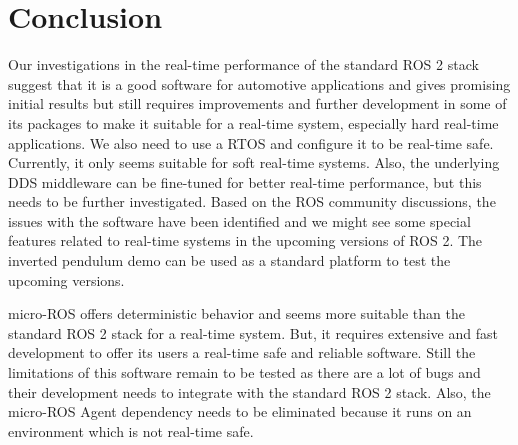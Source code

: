 \documentclass[%
xelatex,
	oneside,		%
	12pt,			%
	parskip=half,	%
	abstracton,
	chapterprefix=true%
    appendixprefix=true]
{scrbook}
\begin{document}
		\chapter{Conclusion}
			
\rofoot[\pagemark]{\pagemark}
Our investigations in the real-time performance of the standard ROS 2 stack suggest that it is a good software for automotive applications and gives promising initial results but still requires improvements and further development in some of its packages to make it suitable for a real-time system, especially hard real-time applications. We also need to use a RTOS and configure it to be real-time safe. Currently, it only seems suitable for soft real-time systems. Also, the underlying DDS middleware can be fine-tuned for better real-time performance, but this needs to be further investigated. Based on the ROS community discussions, the issues with the software have been identified and we might see some special features related to real-time systems in the upcoming versions of ROS 2. The inverted pendulum demo can be used as a standard platform to test the upcoming versions.

\vspace*{0.5cm}
micro-ROS offers deterministic behavior and seems more suitable than the standard ROS 2 stack for a real-time system. But, it requires extensive and fast development to offer its users a real-time safe and reliable software. Still the limitations of this software remain to be tested as there are a lot of bugs and their development needs to integrate with the standard ROS 2 stack. Also, the micro-ROS Agent dependency needs to be eliminated because it runs on an environment which is not real-time safe.
\end{document}
